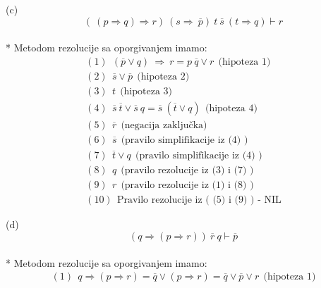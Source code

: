 \documentclass[12pt]{article}
\begin{document}
\begin{enumerate}
		(c) \begin{equation*}
		    (~(p \Rightarrow q) \Rightarrow r)~(s \Rightarrow~\overline{p})~t~\overline{s}~(t \Rightarrow q) \vdash r
		\end{equation*}
 		\\
		* Metodom rezolucije sa oporgivanjem imamo: 
		\begin{align*}    
		
		    (1)~~ (\overline{p} \vee q)~\Rightarrow~r = p~\overline{q} \vee r ~~ \text{(hipoteza~1)} \\
		    
		    (2)~~ \overline{s} \vee \overline{p} ~~ \text{(hipoteza~2)} \\
		    
		    (3)~~ t ~~ \text{(hipoteza~3)} \\
		    
		    (4)~~ \overline{s}~\overline{t} \vee \overline{s}~q = \overline{s}~(\overline{t} \vee q)  ~~ \text{(hipoteza~4)} \\
		    
		    (5)~~ \overline{r} ~~\text{(negacija zaključka)}\\
		    
		    (6)~~ \overline{s} ~~\text{(pravilo~simplifikacije~iz~(4)~)} \\
		    
		    (7)~~ \overline{t} \vee q ~~\text{(pravilo~simplifikacije~iz~(4)~)} \\
		    
		    (8)~~ q ~~\text{(pravilo~rezolucije~iz~(3)~i~(7)~)} \\
		    
		    (9)~~ r ~~\text{(pravilo~rezolucije~iz~(1)~i~(8)~)} \\
		    
		    (10)~~ \text{Pravilo~rezolucije~iz~(~(5)~i~(9)~)~-~NIL}
		\end{align*}
		\newpage
		
		(d) \begin{equation*}
		    (q \Rightarrow ( p \Rightarrow r))~\overline{r}~q \vdash \overline{p}
		\end{equation*}
 		\\
		* Metodom rezolucije sa oporgivanjem imamo: 
		\begin{align*}    
		    
		    (1)~~ q \Rightarrow (p \Rightarrow r) = \overline{q} \vee (p \Rightarrow r) = \overline{q} \vee \overline{p} \vee r ~~ \text{(hipoteza~1)} \\
		    

\end{align*}
\end{enumerate}
\end{document}
